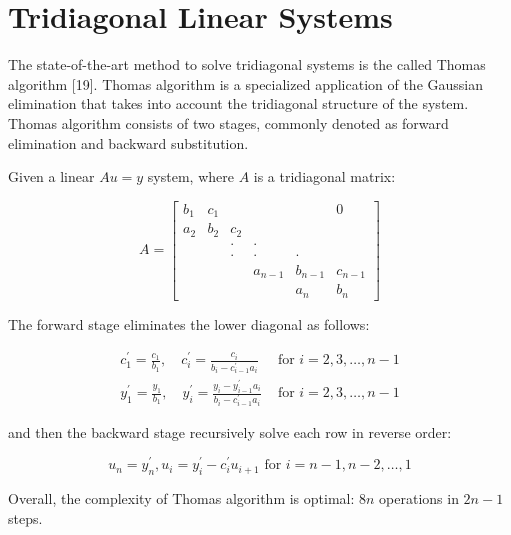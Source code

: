 \vspace{10ex}
\section{Tridiagonal Linear Systems}
The state-of-the-art method to solve tridiagonal systems is the called Thomas algorithm [19]. Thomas algorithm is a specialized application of the Gaussian elimination
that takes into account the tridiagonal structure of the system. Thomas algorithm
consists of two stages, commonly denoted as forward elimination and backward substitution.

Given a linear $Au = y$ system, where $A$ is a tridiagonal matrix:

\begin{equation}
    A=\left[\begin{array}{cccccc}
        b_{1} & c_{1} & & & & 0 \\
        a_{2} & b_{2} & c_{2} & & & \\
        & & \cdot & \cdot & & \\
        & & \cdot & \cdot & \cdot & \\
        & & & a_{n-1} & b_{n-1} & c_{n-1} \\
        & & & & a_{n} & b_{n}
        \end{array}\right]
\end{equation}

The forward stage eliminates the lower diagonal as follows:

\begin{equation}
    \begin{aligned}
        c_{1}^{\prime}=\frac{c_{1}}{b_{1}}, \quad c_{i}^{\prime}=\frac{c_{i}}{b_{i}-c_{i-1}^{\prime} a_{i}} & \text { for } i=2,3, \ldots, n-1 \\
        y_{1}^{\prime}=\frac{y_{1}}{b_{1}}, \quad y_{i}^{\prime}=\frac{y_{i}-y_{i-1}^{\prime} a_{i}}{b_{i}-c_{i-1}^{\prime} a_{i}} & \text { for } i=2,3, \ldots, n-1
    \end{aligned}
\end{equation}

and then the backward stage recursively solve each row in reverse order:

\begin{equation}
    u_{n}=y_{n}^{\prime}, u_{i}=y_{i}^{\prime}-c_{i}^{\prime} u_{i+1} \text { for } i=n-1, n-2, \ldots, 1
\end{equation}

Overall, the complexity of Thomas algorithm is optimal: $8n$ operations 
in $2n - 1$ steps.

